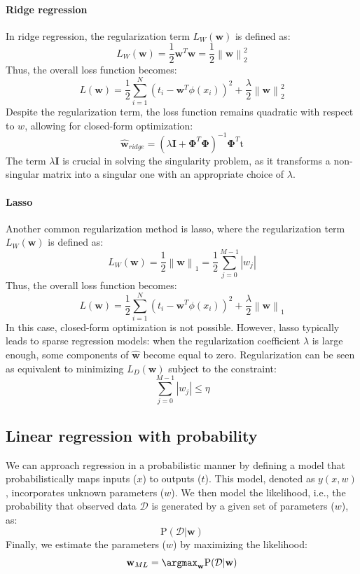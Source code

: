 \paragraph*{Ridge regression}
In ridge regression, the regularization term $L_W(\textbf{w})$ is defined as:
\[L_W(\textbf{w})=\dfrac{1}{2}\textbf{w}^T\textbf{w}=\dfrac{1}{2}\left\lVert \textbf{w} \right\rVert_2^2 \]
Thus, the overall loss function becomes:
\[L(\textbf{w})=\dfrac{1}{2}\sum_{i=1}^N \left( t_i-\textbf{w}^T\phi(x_i) \right)^2 + \dfrac{\lambda}{2}\left\lVert \textbf{w} \right\rVert_2^2\]
Despite the regularization term, the loss function remains quadratic with respect to $w$, allowing for closed-form optimization:
\[\hat{\textbf{w}}_{ridge}=\left( \lambda\textbf{I}+\boldsymbol{\Phi}^T \boldsymbol{\Phi} \right)^{-1}\boldsymbol{\Phi}^T\text{t}\]
The term $\lambda\textbf{I}$ is crucial in solving the singularity problem, as it transforms a non-singular matrix into a singular one with an appropriate choice of $\lambda$. 

\paragraph*{Lasso}
Another common regularization method is lasso, where the regularization term $L_W(\textbf{w})$ is defined as:
\[L_W(\textbf{w})=\dfrac{1}{2}\left\lVert \textbf{w} \right\rVert_1=\dfrac{1}{2}\sum_{j=0}^{M-1}\left\lvert w_j \right\rvert\]
Thus, the overall loss function becomes:
\[L(\textbf{w})=\dfrac{1}{2}\sum_{i=1}^N \left( t_i-\textbf{w}^T\phi(x_i) \right)^2 + \dfrac{\lambda}{2}\left\lVert \textbf{w} \right\rVert_1\]
In this case, closed-form optimization is not possible. 
However, lasso typically leads to sparse regression models: when the regularization coefficient $\lambda$ is large enough, some components of $\hat{\textbf{w}}$ become equal to zero.
Regularization can be seen as equivalent to minimizing  $L_D(\textbf{w})$ subject to the constraint:
\[\sum_{j=0}^{M-1}\left\lvert w_j \right\rvert \leq \eta\] 

\subsection{Linear regression with probability}
We can approach regression in a probabilistic manner by defining a model that probabilistically maps inputs ($x$) to outputs ($t$).
This model, denoted as $y(x, w)$, incorporates unknown parameters ($w$).
We then model the likelihood, i.e., the probability that observed data $\mathcal{D}$ is generated by a given set of parameters ($w$), as: 
\[\text{P}(\mathcal{D}|\textbf{w})\]
Finally, we estimate the parameters ($w$) by maximizing the likelihood:
\[\textbf{w}_{ML}=\argmax_{\textbf{w}}\text{P}(\mathcal{D}|\textbf{w})\]

